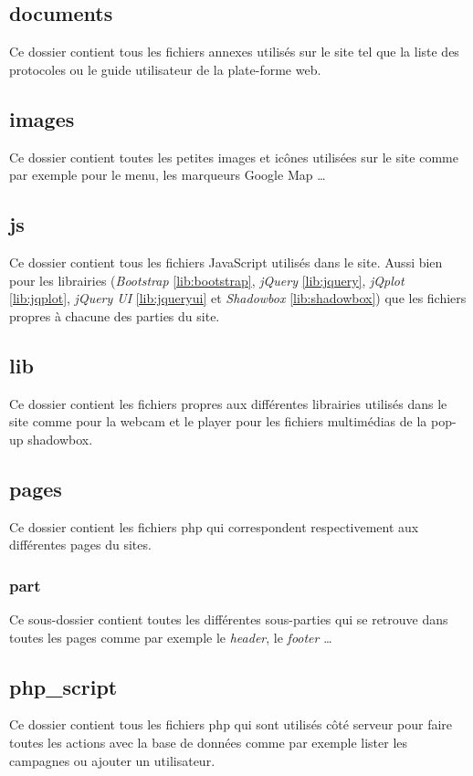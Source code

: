\documentclass[twoside]{EPURapport}
\begin{document}
		\subsection{documents}
		Ce dossier contient tous les fichiers annexes utilisés sur le site tel que la liste des protocoles ou le guide utilisateur de la plate-forme web.
		
		\subsection{images}
		Ce dossier contient toutes les petites images et icônes utilisées sur le site comme par exemple pour le menu, les marqueurs Google Map \ldots
		
		\subsection{js}
		Ce dossier contient tous les fichiers JavaScript utilisés dans le site. Aussi bien pour les librairies (\emph{Bootstrap} \ref{lib:bootstrap}, \emph{jQuery} \ref{lib:jquery}, \emph{jQplot} \ref{lib:jqplot}, \emph{jQuery UI} \ref{lib:jqueryui} et \emph{Shadowbox} \ref{lib:shadowbox}) que les fichiers propres à chacune des parties du site.
		
		\subsection{lib}
		Ce dossier contient les fichiers propres aux différentes librairies utilisés dans le site comme pour la webcam et le player pour les fichiers multimédias de la pop-up shadowbox.
		
		\subsection{pages}
		Ce dossier contient les fichiers php qui correspondent respectivement aux différentes pages du sites.
		
			\subsubsection{part}
			Ce sous-dossier contient toutes les différentes sous-parties qui se retrouve dans toutes les pages comme par exemple le \emph{header}, le \emph{footer} \ldots
		
		\subsection{php\_script}
		Ce dossier contient tous les fichiers php qui sont utilisés côté serveur pour faire toutes les actions avec la base de données comme par exemple lister les campagnes ou ajouter un utilisateur.
	
\end{document}
